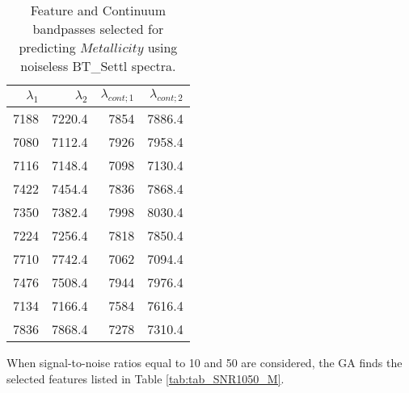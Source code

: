 \begin{table}
\begin{center}
\begin{tabular}{rrrr}
  \hline
  $\lambda_1$ & $\lambda_2$ & $\lambda_{cont;1}$ & $\lambda_{cont;2} $ \\ 
  \hline
7188 & 7220.4 &	7854 & 7886.4 \\ 
7080 & 7112.4 &	7926 & 7958.4 \\
7116 & 7148.4 &	7098 & 7130.4 \\
7422 & 7454.4 &	7836 & 7868.4 \\
7350 & 7382.4 &	7998 & 8030.4 \\
7224 & 7256.4 &	7818 & 7850.4 \\
7710 & 7742.4 &	7062 & 7094.4 \\
7476 & 7508.4 &	7944 & 7976.4 \\
7134 & 7166.4 &	7584 & 7616.4 \\
7836 & 7868.4 &	7278 & 7310.4 \\
\hline
\end{tabular}
\caption {Feature and Continuum bandpasses selected for predicting $Metallicity$ 
      using noiseless BT\_Settl spectra.} \label{tab:tab_SNRoo_M}
\end{center}
\end{table}

When signal-to-noise ratios equal to 10 and 50 are considered, the
GA finds the selected features listed in Table \ref{tab:tab_SNR1050_M}.



